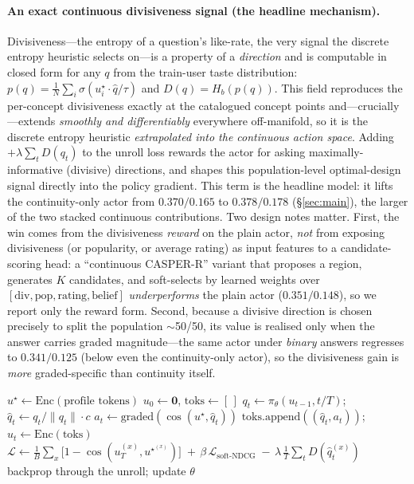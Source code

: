 \documentclass[11pt]{article}
\newcommand{\ustar}{u^{\star}}
\begin{document}
\paragraph{An exact continuous divisiveness signal (the headline mechanism).} Divisiveness---the entropy of a question's
like-rate, the very signal the discrete entropy heuristic selects on---is a property of a \emph{direction} and is
computable in closed form for any $q$ from the train-user taste distribution:
$p(q)=\frac1N\sum_i\sigma(\ustar_i\!\cdot\hat q/\tau)$ and $D(q)=H_b(p(q))$. This field reproduces the per-concept
divisiveness exactly at the catalogued concept points and---crucially---extends \emph{smoothly and differentiably}
everywhere off-manifold, so it is the discrete entropy heuristic \emph{extrapolated into the continuous action space}.
Adding $+\lambda\sum_t D(q_t)$ to the unroll loss rewards the actor for asking maximally-informative (divisive)
directions, and shapes this population-level optimal-design signal directly into the policy gradient. This term is the
headline model: it lifts the continuity-only actor from $0.370/0.165$ to $\mathbf{0.378/0.178}$ (\S\ref{sec:main}), the
larger of the two stacked continuous contributions. Two design notes matter. First, the win comes from the divisiveness
\emph{reward} on the plain actor, \emph{not} from exposing divisiveness (or popularity, or average rating) as input
features to a candidate-scoring head: a ``continuous CASPER-R'' variant that proposes a region, generates $K$ candidates,
and soft-selects by learned weights over $[\text{div},\text{pop},\text{rating},\text{belief}]$ \emph{underperforms} the
plain actor ($0.351/0.148$), so we report only the reward form. Second, because a divisive direction is chosen precisely
to split the population $\sim$50/50, its value is realised only when the answer carries graded magnitude---the same actor
under \emph{binary} answers regresses to $0.341/0.125$ (below even the continuity-only actor), so the divisiveness gain is
\emph{more} graded-specific than continuity itself.

\begin{algorithm}[t]
\caption{Continuous-actor training by differentiable unroll (one batch)}\label{alg:unroll}
\begin{algorithmic}[1]
  \State $\ustar \gets \mathrm{Enc}(\text{profile tokens})$ 
  \State $u_0 \gets \mathbf{0}$, $\text{toks}\gets[\,]$
    \State $q_t \gets \pi_\theta(u_{t-1}, t/T)$;\quad $\hat q_t \gets q_t/\|q_t\|\cdot c$
    \State $a_t \gets \mathrm{graded}(\cos(\ustar,\hat q_t))$ 
    \State $\text{toks}.\text{append}((\hat q_t,a_t))$;\quad $u_t \gets \mathrm{Enc}(\text{toks})$
  \EndFor
\EndFor
\State $\mathcal{L} \gets \tfrac1B\sum_x \big[1-\cos(u_T^{(x)},\ustar^{(x)})\big]\;+\,\beta\,\mathcal{L}_{\text{soft-NDCG}}\;-\,\lambda\,\tfrac1T\textstyle\sum_t D(\hat q_t^{(x)})$ 
\State backprop through the unroll; update $\theta$ 
\end{algorithmic}
\end{algorithm}
\end{document}
